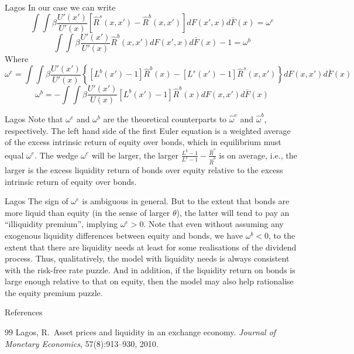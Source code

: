 \documentclass[aspectratio=169,xcolor=dvipsnames]{beamer}
\begin{document}
\begin{frame}{Lagos}
    In our case we can write
    \[
        \int \int \beta \frac{U'(x')}{U'(x)} [\hat R^s(x, x') - \hat R^b(x, x')] dF(x', x) d\bar F(x) = \omega^e
    \]
    \[
        \int \int \beta \frac{U'(x')}{U'(x)} \hat R^b(x, x') dF(x', x) d\bar F(x) - 1 = \omega^b
    \]
    Where
    \[
        \omega^e = \int \int \beta \frac{U'(x')}{U'(x)} \left\{ [L^b(x') - 1] \hat R^b(x) - [L^s(x') - 1] \hat R^s(x, x')\right\} dF(x, x') d\bar F(x)
    \]
    \[
        \omega^b = -\int \int \beta \frac{U'(x')}{U(x)} [L^b(x') - 1] \hat R^b(x) dF(x, x') d\bar F(x)
    \]
\end{frame}

\begin{frame}{Lagos}
    Note that $\omega^e$ and $\omega^b$ are the theoretical counterparts to $\hat \omega^e$ and $\hat \omega^b$, respectively. The left hand side of the first Euler equation is a weighted average of the excess intrinsic return of equity over bonds, which in equilibrium must equal $\omega^e$. The wedge $\omega^e$ will be larger, the larger $\frac{L^b - 1}{L^s - 1} - \frac{\hat R^s}{\hat R^b}$ is on average, i.e., the larger is the excess liquidity return of bonds over equity relative to the excess intrinsic return of equity over bonds.
\end{frame}

\begin{frame}{Lagos}
    The sign of $\omega^e$ is ambiguous in general. But to the extent that bonds are more liquid than equity (in the sense of larger $\theta$), the latter will tend to pay an ``illiquidity premium'', implying $\omega^e > 0$. Note that even without assuming any exogenous liquidity differences between equity and bonds, we have $\omega^b < 0$, to the extent that there are liquidity needs at least for some realisations of the dividend process. Thus, qualitatively, the model with liquidity needs is always consistent with the risk-free rate puzzle. And in addition, if the liquidity return on bonds is large enough relative to that on equity, then the model may also help rationalise the equity premium puzzle.
\end{frame}

\begin{frame}[allowframebreaks]{References}
    \small
    \begin{thebibliography}{99}
            Lagos, R.\ Asset prices and liquidity in an exchange economy. \textit{Journal of Monetary Economics}, 57(8):913--930, 2010.
    \end{thebibliography}
\end{frame}
\end{document}
